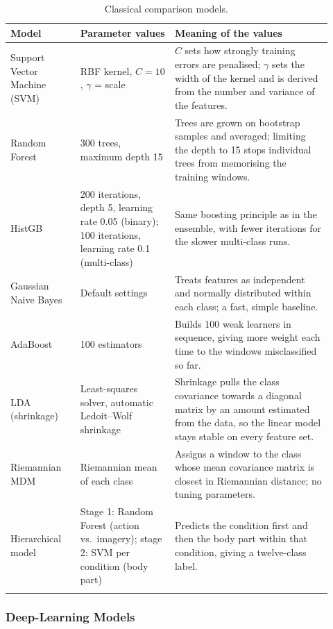\documentclass[pdflatex,sn-mathphys-num]{sn-jnl}%
\theoremstyle{thmstyleone}%
\theoremstyle{thmstyletwo}%
\theoremstyle{thmstylethree}%
\begin{document}
\begin{table}[htbp]
\centering
\caption{Classical comparison models.}
\label{tab:basemodels}
\footnotesize
\begin{tabular}{@{}p{0.2\linewidth}p{0.27\linewidth}p{0.45\linewidth}@{}}
\toprule
\textbf{Model} & \textbf{Parameter values} & \textbf{Meaning of the values} \\
\midrule
Support Vector Machine (SVM) \citep{CortesVapnik1995} & RBF kernel, $C = 10$, $\gamma$ = scale & $C$ sets how strongly training errors are penalised; $\gamma$ sets the width of the kernel and is derived from the number and variance of the features. \\ \addlinespace
Random Forest \citep{Breiman2001} & 300 trees, maximum depth 15 & Trees are grown on bootstrap samples and averaged; limiting the depth to 15 stops individual trees from memorising the training windows. \\ \addlinespace
HistGB & 200 iterations, depth 5, learning rate 0.05 (binary); 100 iterations, learning rate 0.1 (multi-class) & Same boosting principle as in the ensemble, with fewer iterations for the slower multi-class runs. \\ \addlinespace
Gaussian Naive Bayes & Default settings & Treats features as independent and normally distributed within each class; a fast, simple baseline. \\ \addlinespace
AdaBoost & 100 estimators & Builds 100 weak learners in sequence, giving more weight each time to the windows misclassified so far. \\ \addlinespace
LDA (shrinkage) & Least-squares solver, automatic Ledoit--Wolf shrinkage & Shrinkage pulls the class covariance towards a diagonal matrix by an amount estimated from the data, so the linear model stays stable on every feature set. \\ \addlinespace
Riemannian MDM \citep{Barachant2012} & Riemannian mean of each class & Assigns a window to the class whose mean covariance matrix is closest in Riemannian distance; no tuning parameters. \\ \addlinespace
Hierarchical model & Stage 1: Random Forest (action vs.\ imagery); stage 2: SVM per condition (body part) & Predicts the condition first and then the body part within that condition, giving a twelve-class label. \\
\botrule
\end{tabular}
\end{table}

\subsubsection{Deep-Learning Models}\label{subsec:dl}
\end{document}

